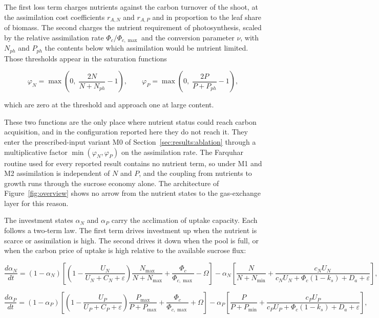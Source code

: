The first loss term charges nutrients against the carbon turnover of the shoot, at
the assimilation cost coefficients $r_{A,N}$ and $r_{A,P}$ and in proportion to
the leaf share of biomass. The second charges the nutrient requirement of
photosynthesis, scaled by the relative assimilation rate $\Phi_c/\Phi_{c,\max}$
and the conversion parameter $\nu$, with $N_{ph}$ and $P_{ph}$ the contents below
which assimilation would be nutrient limited. Those thresholds appear in the
saturation functions

\begin{equation}
\varphi_N = \max\!\left(0,\; \frac{2N}{N+N_{ph}} - 1\right),
\qquad
\varphi_P = \max\!\left(0,\; \frac{2P}{P+P_{ph}} - 1\right),
\label{eq:nutrient_saturation}
\end{equation}

which are zero at the threshold and approach one at large content.

These two functions are the only place where nutrient status could reach carbon
acquisition, and in the configuration reported here they do not reach it. They
enter the prescribed-input variant M0 of Section~\ref{sec:results:ablation}
through a multiplicative factor $\min(\varphi_N,\varphi_P)$ on the assimilation
rate. The Farquhar routine used for every reported result contains no nutrient
term, so under M1 and M2 assimilation is independent of $N$ and $P$, and the
coupling from nutrients to growth runs through the sucrose economy alone. The
architecture of Figure~\ref{fig:overview} shows no arrow from the nutrient
states to the gas-exchange layer for this reason.

The investment states $\alpha_N$ and $\alpha_P$ carry the acclimation of uptake
capacity. Each follows a two-term law. The first term drives investment up when the
nutrient is scarce or assimilation is high. The second drives it down when the pool
is full, or when the carbon price of uptake is high relative to the available
sucrose flux:

\begin{equation}
\frac{d\alpha_N}{dt}
= \left(1-\alpha_N\right)
\left[
\left(1 - \frac{U_N}{U_N + C_N + \varepsilon}\right)
\frac{N_{\max}}{N + N_{\max}}
+ \frac{\Phi_c}{\Phi_{c,\max}}
- \Omega
\right]
- \alpha_N
\left[
\frac{N}{N+N_{\min}}
+ \frac{c_N U_N}{c_N U_N + \Phi_c\left(1-k_s\right) + D_a + \varepsilon}
\right],
\label{eq:dalphaN}
\end{equation}

\begin{equation}
\frac{d\alpha_P}{dt}
= \left(1-\alpha_P\right)
\left[
\left(1 - \frac{U_P}{U_P + C_P + \varepsilon}\right)
\frac{P_{\max}}{P + P_{\max}}
+ \frac{\Phi_c}{\Phi_{c,\max}}
+ \Omega
\right]
- \alpha_P
\left[
\frac{P}{P+P_{\min}}
+ \frac{c_P U_P}{c_P U_P + \Phi_c\left(1-k_s\right) + D_a + \varepsilon}
\right],
\label{eq:dalphaP}
\end{equation}

